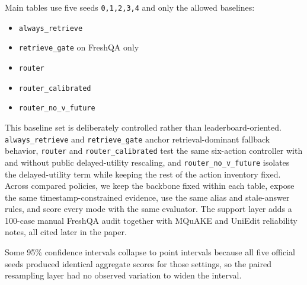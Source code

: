 Main tables use five seeds \texttt{0,1,2,3,4} and only the allowed baselines:
\begin{itemize}[leftmargin=1.5em]
\item \texttt{always\_retrieve}
\item \texttt{retrieve\_gate} on FreshQA only
\item \texttt{router}
\item \texttt{router\_calibrated}
\item \texttt{router\_no\_v\_future}
\end{itemize}

This baseline set is deliberately controlled rather than leaderboard-oriented. \texttt{always\_retrieve} and \texttt{retrieve\_gate} anchor retrieval-dominant fallback behavior, \texttt{router} and \texttt{router\_calibrated} test the same six-action controller with and without public delayed-utility rescaling, and \texttt{router\_no\_v\_future} isolates the delayed-utility term while keeping the rest of the action inventory fixed. Across compared policies, we keep the backbone fixed within each table, expose the same timestamp-constrained evidence, use the same alias and stale-answer rules, and score every mode with the same evaluator. The support layer adds a 100-case manual FreshQA audit together with MQuAKE and UniEdit reliability notes, all cited later in the paper.

Some 95\% confidence intervals collapse to point intervals because all five official seeds produced identical aggregate scores for those settings, so the paired resampling layer had no observed variation to widen the interval.
